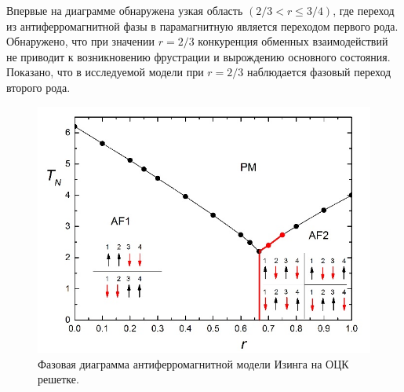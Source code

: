 Впервые на диаграмме обнаружена узкая область $(2/3 < r \leq 3/4)$, где переход из антиферромагнитной фазы в парамагнитную является переходом первого рода. Обнаружено, что при значении $r=2/3$ конкуренция обменных взаимодействий не приводит к возникновению фрустрации и вырождению основного состояния. Показано, что в исследуемой модели при $r = 2/3$ наблюдается фазовый переход второго рода.

\begin{figure}[H]\label{phys1-pic-1}
	\centering
	\includegraphics[width=0.5\linewidth]{content/sections/images/phys1-1}
	\caption{Фазовая диаграмма антиферромагнитной модели Изинга на ОЦК решетке.}
\end{figure}




%
%
%
%
%
%


